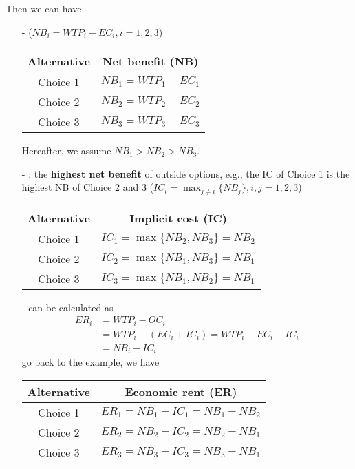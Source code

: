 \documentclass[twoside]{article}
\theoremstyle{definition}
\begin{document}
Then we can have
\begin{itemize}
    \item[-]  ($NB_i=WTP_i-EC_i,i=1,2,3$)
    \begin{table}[h]
    \centering
        \begin{tabular}{c|c}
            Alternative & Net benefit (NB) \\
            \hline
            Choice 1 & $NB_1= WTP_1-EC_1$ \\
            Choice 2 & $NB_2= WTP_2-EC_2$ \\
            Choice 3 & $NB_3= WTP_3-EC_3$
        \end{tabular}
    \end{table}
    
    Hereafter, we assume $NB_1 > NB_2 > NB_3$.
    \item[-] : the \textbf{highest net benefit} of outside options, e.g., the IC of Choice 1 is the highest NB of Choice 2 and 3 ($IC_i = \max_{j\neq i}\{NB_j\},i,j=1,2,3$)
    \begin{table}[h]
    \centering
        \begin{tabular}{c|c}
            Alternative & Implicit cost (IC) \\
            \hline
            Choice 1 & $IC_1= \max\{NB_2,NB_3\} = NB_2$ \\
            Choice 2 & $IC_2= \max\{NB_1,NB_3\} = NB_1$ \\
            Choice 3 & $IC_3= \max\{NB_1,NB_2\}= NB_1$
        \end{tabular}
    \end{table}
    
    \item[-]  can be calculated as
    \begin{align*}
        ER_i &= WTP_i - OC_i \\
        & = WTP_i - (EC_i + IC_i)= WTP_i -EC_i - IC_i\\
        & = NB_i - IC_i
    \end{align*}
    go back to the example, we have
    \begin{table}[h]
    \centering
        \begin{tabular}{c|c}
            Alternative & Economic rent (ER) \\
            \hline
            Choice 1 & $ER_1= NB_1 - IC_1 = NB_1- NB_2$ \\
            Choice 2 & $ER_2= NB_2 - IC_2 = NB_2- NB_1$ \\
            Choice 3 & $ER_3= NB_3 - IC_3 = NB_3- NB_1$
        \end{tabular}
    \end{table}

\end{itemize}
\end{document}
